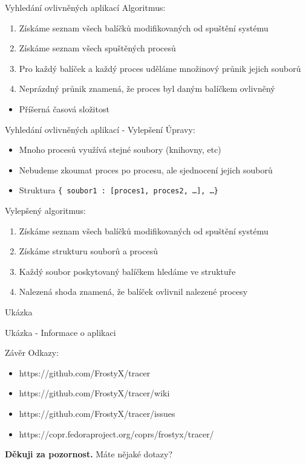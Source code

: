 \documentclass{beamer}
\newcommand{\separator}{\vspace{15pt}}
\begin{document}
	\begin{frame}{Vyhledání ovlivněných aplikací}
		Algoritmus:
		\begin{enumerate}
			\item Získáme seznam všech balíčků modifikovaných od spuštění systému
			\item Získáme seznam všech spuštěných procesů
			\item Pro každý balíček a každý proces uděláme množinový průnik jejich souborů
			\item Neprázdný průnik znamená, že proces byl daným balíčkem ovlivněný
		\end{enumerate}
		\separator
		\begin{itemize}
			\item Příšerná časová složitost
		\end{itemize}
	\end{frame}

	\begin{frame}{Vyhledání ovlivněných aplikací - Vylepšení}
		Úpravy:
		\begin{itemize}
			\item Mnoho procesů využívá stejné soubory (knihovny, etc)
			\item Nebudeme zkoumat proces po procesu, ale sjednocení jejich souborů
			\item Struktura \texttt{\{ soubor1 : [proces1, proces2, \dots], \dots \}}
		\end{itemize}
		\separator
		Vylepšený algoritmus:
		\begin{enumerate}
			\item Získáme seznam všech balíčků modifikovaných od spuštění systému
			\item Získáme strukturu souborů a procesů
			\item Každý soubor poskytovaný balíčkem hledáme ve struktuře
			\item Nalezená shoda znamená, že balíček ovlivnil nalezené procesy
		\end{enumerate}
	\end{frame}

	\begin{frame}{Ukázka}
		
	\end{frame}

	\begin{frame}{Ukázka - Informace o aplikaci}
		
	\end{frame}

	\begin{frame}{Závěr}
		Odkazy:
		\begin{itemize}
			\item https://github.com/FrostyX/tracer
			\item https://github.com/FrostyX/tracer/wiki
			\item https://github.com/FrostyX/tracer/issues
			\item https://copr.fedoraproject.org/coprs/frostyx/tracer/
		\end{itemize}
		\vspace{70pt}
		\centerline{\textbf{Děkuji za pozornost.} Máte nějaké dotazy?}
	\end{frame}
\end{document}
